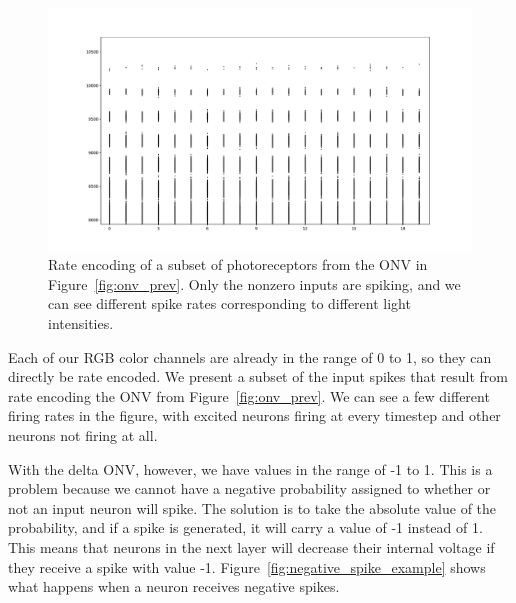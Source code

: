 \documentclass [MS] {UCLAthesis}
\begin{document}
\begin{figure}
    \centering
    \includegraphics[width=1.0\textwidth]{onv_rate_prev}
    \caption[Rate encoded ONV]{Rate encoding of a subset of photoreceptors from the ONV in Figure~\ref{fig:onv_prev}. Only the nonzero inputs are spiking, and we can see different spike rates corresponding to different light intensities. }
    \label{fig:onv_encode_rate}
\end{figure}

Each of our RGB color channels are already in the range of 0 to 1, so they can directly be rate encoded. We present a subset of the input spikes that result from rate encoding the ONV from Figure~\ref{fig:onv_prev}. We can see a few different firing rates in the figure, with excited neurons firing at every timestep and other neurons not firing at all.

With the delta ONV, however, we have values in the range of -1 to 1. This is a problem because we cannot have a negative probability assigned to whether or not an input neuron will spike. The solution is to take the absolute value of the probability, and if a spike is generated, it will carry a value of -1 instead of 1. This means that neurons in the next layer will decrease their internal voltage if they receive a spike with value -1. Figure~\ref{fig:negative_spike_example} shows what happens when a neuron receives negative spikes.
\end{document}

